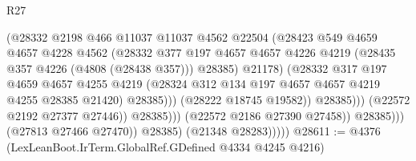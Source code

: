 \begin{lexlean}{R27}
\begin{coremodule}
                                          (@28332
                                            @2198
                                            @466
                                            @11037
                                            @11037
                                            @4562
                                            @22504
                                            (@28423
                                              @549
                                              @4659
                                              @4657
                                              @4228
                                              @4562
                                              (@28332
                                                @377
                                                @197
                                                @4657
                                                @4657
                                                @4226
                                                @4219
                                                (@28435 @357 @4226 (@4808 (@28438 @357)))
                                                @28385)
                                              @21178)
                                            (@28332
                                              @317
                                              @197
                                              @4659
                                              @4657
                                              @4255
                                              @4219
                                              (@28324
                                                @312
                                                @134
                                                @197
                                                @4657
                                                @4657
                                                @4219
                                                @4255
                                                @28385
                                                @21420)
                                              @28385)))
                                        (@28222 @18745 @19582))
                                      @28385)))
                                (@22572 @2192 @27377 @27446))
                              @28385)))
                        (@22572 @2186 @27390 @27458))
                      @28385)))
                (@27813 @27466 @27470))
              @28385)
            (@21348 @28283)))))
@28611 := @4376 (LexLeanBoot.IrTerm.GlobalRef.GDefined @4334 @4245 @4216)

\end{coremodule}
\end{lexlean}
